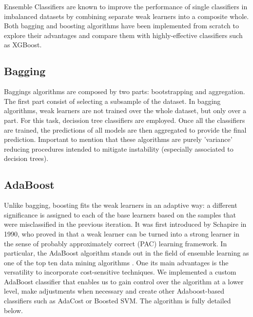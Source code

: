 \documentclass[conference]{IEEEtran}
\begin{document}
Ensemble Classifiers are known to improve the performance of single classifiers in imbalanced datasets \cite{ensembles_review} by combining separate weak learners into a composite whole. Both bagging and boosting algorithms have been implemented from scratch to explore their advantages and compare them with highly-effective classifiers such as XGBoost. 

\subsection{Bagging}
Baggings algorithms are composed by two parts: bootstrapping and aggregation. The first part consist of selecting a subsample of the dataset. In bagging algorithms, weak learners are not trained over the whole dataset, but only over a part. For this task, decission tree classifiers are employed. Once all the classifiers are trained, the predictions of all models are then aggregated to provide the final prediction. Important to mention that these algorithms are purely 'variance' reducing procedures intended to mitigate instability (especially associated to decision trees). 

\subsection{AdaBoost}
Unlike bagging, boosting fits the weak learners in an adaptive way: a different significance is assigned to each of the base learners based on the samples that were misclassified in the previous iteration. It was first introduced by Schapire in 1990, who proved in \cite{schapire} that a weak learner can be turned into a strong learner in the sense of probably approximately correct (PAC) learning framework. In particular, the AdaBoost algorithm stands out in the field of ensemble learning as one of the top ten data mining algorithms \cite{top10algo}. One its main advantages is the versatility to incorporate cost-sensitive techniques. We implemented a custom AdaBoost classifier that enables us to gain control over the algorithm at a lower level, make adjustments when necessary and create other Adaboost-based classifiers such as AdaCost or Boosted SVM. The algorithm is fully detailed below.
\end{document}
